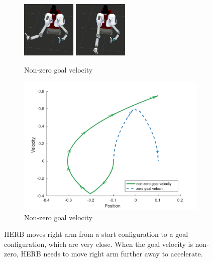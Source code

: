\documentclass[letterpaper, 10 pt, conference]{ieeeconf}  %
\begin{document}
\begin{figure}[t!]
\begin{minipage}[t]{0.64\linewidth}
\begin{subfigure}[b]{\textwidth}
		\includegraphics[height=2.7cm]{fig/motivation/fast3}
		\includegraphics[height=2.7cm]{fig/motivation/fast4}
		\caption{Non-zero goal velocity}
		\label{fig:motivation:fast}
	\end{subfigure}
    \end{minipage}
    \begin{minipage}[t]{0.33\linewidth}
    	\begin{subfigure}[c]{\textwidth}
    		\includegraphics[width=\textwidth]{fig/motivation/phase_plot}
    		\caption{Non-zero goal velocity}
    		\label{fig:motivation:phase_plot}
        \end{subfigure}
   	\end{minipage}
	\caption{HERB moves right arm from a start configuration to a goal configuration, which are very close.
    When the goal velocity is non-zero, HERB needs to move right arm further away to accelerate.
	}
	\label{fig:motivation}
\end{figure} 
\end{document}

